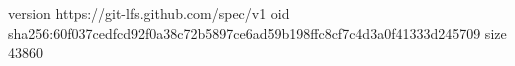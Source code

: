 version https://git-lfs.github.com/spec/v1
oid sha256:60f037cedfcd92f0a38c72b5897ce6ad59b198ffc8cf7c4d3a0f41333d245709
size 43860
